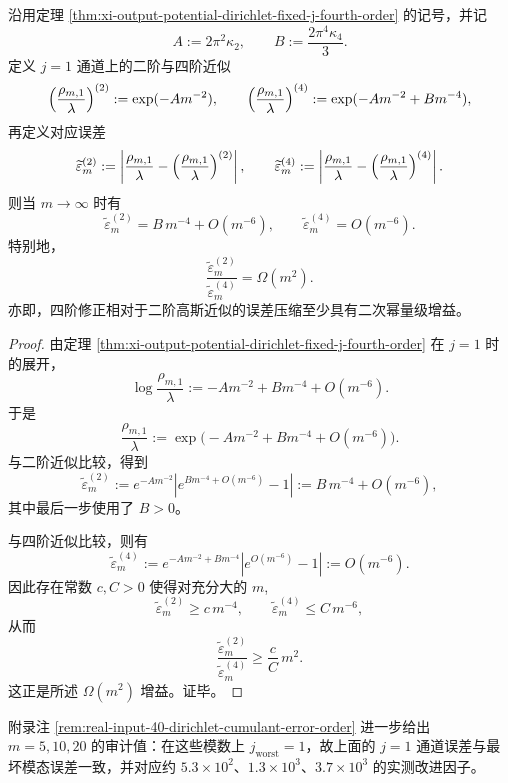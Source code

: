 \begin{theorem}[四阶修正相对二阶近似的二次量级增益]\label{thm:xi-output-potential-dirichlet-fourth-order-gain}
沿用定理 \ref{thm:xi-output-potential-dirichlet-fixed-j-fourth-order} 的记号，并记
\[
A:=2\pi^2\kappa_2,
\qquad
B:=\frac{2\pi^4\kappa_4}{3}.
\]
定义 \(j=1\) 通道上的二阶与四阶近似
\[
\Bigl(\frac{\rho_{m,1}}{\lambda}\Bigr)^{(2)}
:=
\exp(-A m^{-2}),
\qquad
\Bigl(\frac{\rho_{m,1}}{\lambda}\Bigr)^{(4)}
:=
\exp(-A m^{-2}+B m^{-4}),
\]
再定义对应误差
\[
\widetilde\varepsilon_m^{(2)}
:=
\left\lvert
\frac{\rho_{m,1}}{\lambda}
-\Bigl(\frac{\rho_{m,1}}{\lambda}\Bigr)^{(2)}
\right\rvert,
\qquad
\widetilde\varepsilon_m^{(4)}
:=
\left\lvert
\frac{\rho_{m,1}}{\lambda}
-\Bigl(\frac{\rho_{m,1}}{\lambda}\Bigr)^{(4)}
\right\rvert.
\]
则当 \(m\to\infty\) 时有
\[
\boxed{\;
\widetilde\varepsilon_m^{(2)}=B\,m^{-4}+O(m^{-6}),
\qquad
\widetilde\varepsilon_m^{(4)}=O(m^{-6}).\;}
\]
特别地，
\[
\boxed{\;
\frac{\widetilde\varepsilon_m^{(2)}}{\widetilde\varepsilon_m^{(4)}}=\Omega(m^2).\;}
\]
亦即，四阶修正相对于二阶高斯近似的误差压缩至少具有二次幂量级增益。
\end{theorem}
\begin{proof}
由定理 \ref{thm:xi-output-potential-dirichlet-fixed-j-fourth-order} 在 \(j=1\) 时的展开，
\[
\log\frac{\rho_{m,1}}{\lambda}
:=
-A m^{-2}+B m^{-4}+O(m^{-6}).
\]
于是
\[
\frac{\rho_{m,1}}{\lambda}
:=
\exp\!\bigl(-A m^{-2}+B m^{-4}+O(m^{-6})\bigr).
\]
与二阶近似比较，得到
\[
\widetilde\varepsilon_m^{(2)}
:=
e^{-A m^{-2}}
\left|e^{B m^{-4}+O(m^{-6})}-1\right|
:=
B\,m^{-4}+O(m^{-6}),
\]
其中最后一步使用了 \(B>0\)。

与四阶近似比较，则有
\[
\widetilde\varepsilon_m^{(4)}
:=
e^{-A m^{-2}+B m^{-4}}
\left|e^{O(m^{-6})}-1\right|
:=
O(m^{-6}).
\]
因此存在常数 \(c,C>0\) 使得对充分大的 \(m\),
\[
\widetilde\varepsilon_m^{(2)}\ge c\,m^{-4},
\qquad
\widetilde\varepsilon_m^{(4)}\le C\,m^{-6},
\]
从而
\[
\frac{\widetilde\varepsilon_m^{(2)}}{\widetilde\varepsilon_m^{(4)}}
\ge
\frac{c}{C}\,m^2.
\]
这正是所述 \(\Omega(m^2)\) 增益。证毕。
\end{proof}
\noindent 附录注 \ref{rem:real-input-40-dirichlet-cumulant-error-order} 进一步给出 \(m=5,10,20\) 的审计值：在这些模数上 \(j_{\mathrm{worst}}=1\)，故上面的 \(j=1\) 通道误差与最坏模态误差一致，并对应约 \(5.3\times 10^2\)、\(1.3\times 10^3\)、\(3.7\times 10^3\) 的实测改进因子。
